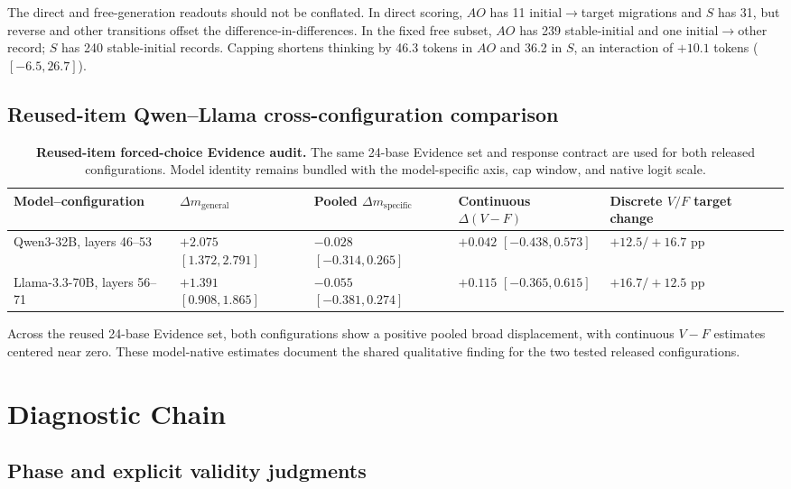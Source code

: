 \documentclass[letterpaper]{article}
\begin{document}
The direct and free-generation readouts should not be conflated.  In direct scoring, $AO$ has 11 initial$\rightarrow$target migrations and $S$ has 31, but reverse and other transitions offset the difference-in-differences.  In the fixed free subset, $AO$ has 239 stable-initial and one initial$\rightarrow$other record; $S$ has 240 stable-initial records.  Capping shortens thinking by 46.3 tokens in $AO$ and 36.2 in $S$, an interaction of $+10.1$ tokens ($[-6.5,26.7]$).

\subsection{Reused-item Qwen--Llama cross-configuration comparison}

\begin{table}[t]
\centering
\small
\begin{tabular}{L{3.3cm}L{3.0cm}L{3.0cm}L{3.0cm}L{2.4cm}}
\toprule
Model--configuration & $\Delta m_{\mathrm{general}}$ & Pooled $\Delta m_{\mathrm{specific}}$ & Continuous $\Delta(V-F)$ & Discrete $V/F$ target change \\
\midrule
Qwen3-32B, layers 46--53 & $+2.075$ $[1.372,2.791]$ & $-0.028$ $[-0.314,0.265]$ & $+0.042$ $[-0.438,0.573]$ & $+12.5/+16.7$ pp \\
Llama-3.3-70B, layers 56--71 & $+1.391$ $[0.908,1.865]$ & $-0.055$ $[-0.381,0.274]$ & $+0.115$ $[-0.365,0.615]$ & $+16.7/+12.5$ pp \\
\bottomrule
\end{tabular}
\caption{\textbf{Reused-item forced-choice Evidence audit.} The same 24-base Evidence set and response contract are used for both released configurations.  Model identity remains bundled with the model-specific axis, cap window, and native logit scale.}
\label{tab:supp-xm}
\end{table}

Across the reused 24-base Evidence set, both configurations show a positive pooled broad displacement, with continuous $V-F$ estimates centered near zero.  These model-native estimates document the shared qualitative finding for the two tested released configurations.

\section{Diagnostic Chain}
\label{supp:diagnostics}

\subsection{Phase and explicit validity judgments}
\end{document}
